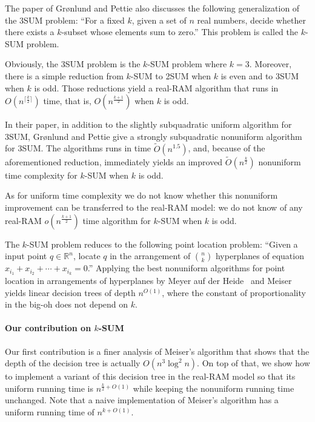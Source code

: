 The paper of Gr\o nlund and Pettie also discusses the following generalization of
the 3SUM problem: ``For a fixed \(k\), given a set of \(n\) real numbers,
decide whether there exists a \(k\)-subset whose elements sum to zero.''
This problem is called the \(k\)-SUM problem.

Obviously, the 3SUM problem is the \(k\)-SUM problem where \(k=3\).
Moreover, there is a simple reduction from \(k\)-SUM to 2SUM when \(k\) is even
and to 3SUM when \(k\) is odd. Those reductions yield a real-RAM algorithm that
runs in \(O(n^{\lceil \frac{k}{2} \rceil})\) time, that is,
\(O(n^{\frac{k+1}{2}})\) when \(k\) is odd.

In their paper, in addition to the slightly subquadratic uniform algorithm for
3SUM, Gr\o nlund and Pettie give a strongly subquadratic nonuniform
algorithm for 3SUM. The algorithms runs in time \(\tilde{O}(n^{1.5})\), and,
because of the aforementioned reduction, immediately yields an improved
\(\tilde{O}(n^{\frac{k}{2}})\) nonuniform time complexity for \(k\)-SUM when
\(k\) is odd.

As for uniform time complexity we do not know whether this nonuniform
improvement can be transferred to the real-RAM model: we do not know of any
real-RAM \(o(n^{\frac{k+1}{2}})\) time algorithm for \(k\)-SUM when
\(k\) is odd.

The \(k\)-SUM problem reduces to the following point location problem: ``Given
a input point \(q \in \mathbb{R}^n\), locate \(q\) in the arrangement of
\(n \choose k\) hyperplanes of equation \(x_{i_1} + x_{i_2} + \cdots +
x_{i_k} = 0\).'' Applying the best nonuniform algorithms for point location in
arrangements of hyperplanes by Meyer auf der Heide~\cite{M84} and
Meiser~\cite{M93} yields linear decision trees of depth \(n^{O(1)}\), where the
constant of proportionality in the big-oh does not depend on \(k\).

\paragraph{Our contribution on \(k\)-SUM}

Our first contribution is a finer analysis of Meiser's algorithm that shows
that the depth of the decision tree is actually \(O(n^3 \log^2 n)\). On top of
that, we show how to implement a variant of this decision tree in the real-RAM
model so that its uniform running time is \(n^{\frac{k}{2} + O(1)}\) while
keeping the nonuniform running time unchanged. Note that a naive implementation
of Meiser's algorithm has a uniform running time of \(n^{k + O(1)}\).


